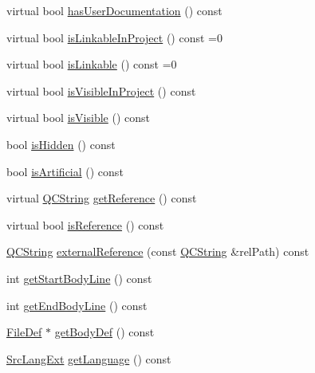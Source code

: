 \begin{DoxyCompactItemize}
\item 
virtual bool \mbox{\hyperlink{class_definition_ab1af13aa3951df825dea34f1bcf2a7fc}{has\+User\+Documentation}} () const
\item 
virtual bool \mbox{\hyperlink{class_definition_a845891c7206d40c3664b562636cdf9fc}{is\+Linkable\+In\+Project}} () const =0
\item 
virtual bool \mbox{\hyperlink{class_definition_a4002fd79c2d4dcf667c37c83d4214deb}{is\+Linkable}} () const =0
\item 
virtual bool \mbox{\hyperlink{class_definition_af5c5321a920e7ff5fb304b630f51964e}{is\+Visible\+In\+Project}} () const
\item 
virtual bool \mbox{\hyperlink{class_definition_adb6bab6d36c2b84b935442a7153b1135}{is\+Visible}} () const
\item 
bool \mbox{\hyperlink{class_definition_a4f303fc4a5c9be7ab8160cf1792e7bda}{is\+Hidden}} () const
\item 
bool \mbox{\hyperlink{class_definition_a24d80ca0884834c9e767482af37b7248}{is\+Artificial}} () const
\item 
virtual \mbox{\hyperlink{class_q_c_string}{Q\+C\+String}} \mbox{\hyperlink{class_definition_a0186c1c36a52590d2c7c9157aaea613f}{get\+Reference}} () const
\item 
virtual bool \mbox{\hyperlink{class_definition_a8405121cdc0253ec9633a87500ac47ba}{is\+Reference}} () const
\item 
\mbox{\hyperlink{class_q_c_string}{Q\+C\+String}} \mbox{\hyperlink{class_definition_a0bd1999f66045c290a4b32e3cb8f8e6b}{external\+Reference}} (const \mbox{\hyperlink{class_q_c_string}{Q\+C\+String}} \&rel\+Path) const
\item 
int \mbox{\hyperlink{class_definition_a5bf4e2d03d7cee134bcd77392cba0e7b}{get\+Start\+Body\+Line}} () const
\item 
int \mbox{\hyperlink{class_definition_a139c68919a773cc9c433f077cdbffcc4}{get\+End\+Body\+Line}} () const
\item 
\mbox{\hyperlink{class_file_def}{File\+Def}} $\ast$ \mbox{\hyperlink{class_definition_a9854754d60caad76e897b156ba13d992}{get\+Body\+Def}} () const
\item 
\mbox{\hyperlink{types_8h_a9974623ce72fc23df5d64426b9178bf2}{Src\+Lang\+Ext}} \mbox{\hyperlink{class_definition_a3c214d451d86bf8994c9d1503ed2843d}{get\+Language}} () const
\item 
\mbox{\label{class_definition_a3a32a78e6ecbc7ab4eb105ad989d5ece}} 

\end{DoxyCompactItemize}
